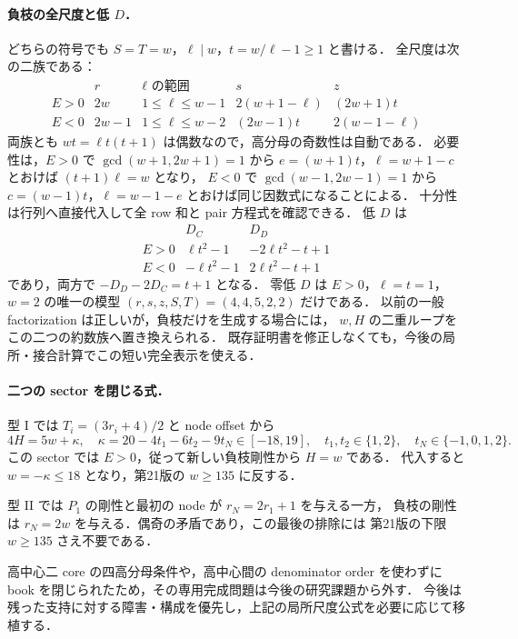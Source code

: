 \paragraph{負枝の全尺度と低 $D$．}
どちらの符号でも $S=T=w$，$\ell\mid w$，$t=w/\ell-1\ge1$ と書ける．
全尺度は次の二族である：
\[
 \begin{array}{c|c|c|c|c}
  &r&\ell\text{ の範囲}&s&z\\\hline
  E>0&2w&1\le\ell\le w-1&2(w+1-\ell)&(2w+1)t\\
  E<0&2w-1&1\le\ell\le w-2&(2w-1)t&2(w-1-\ell)
 \end{array}
\]
両族とも $wt=\ell t(t+1)$ は偶数なので，高分母の奇数性は自動である．
必要性は，$E>0$ で $\gcd(w+1,2w+1)=1$ から
$e=(w+1)t$，$\ell=w+1-c$ とおけば $(t+1)\ell=w$ となり，
$E<0$ で $\gcd(w-1,2w-1)=1$ から
$c=(w-1)t$，$\ell=w-1-e$ とおけば同じ因数式になることによる．
十分性は行列へ直接代入して全 row 和と pair 方程式を確認できる．
低 $D$ は
\[
 \begin{array}{c|cc}
  &D_C&D_D\\\hline
  E>0&\ell t^2-1&-2\ell t^2-t+1\\
  E<0&-\ell t^2-1&2\ell t^2-t+1
 \end{array}
\]
であり，両方で $-D_D-2D_C=t+1$ となる．
零低 $D$ は $E>0$，$\ell=t=1$，$w=2$ の唯一の模型
$(r,s,z,S,T)=(4,4,5,2,2)$ だけである．
以前の一般 factorization は正しいが，負枝だけを生成する場合には，
$w,H$ の二重ループをこの二つの約数族へ置き換えられる．
既存証明書を修正しなくても，今後の局所・接合計算でこの短い完全表示を使える．

\paragraph{二つの sector を閉じる式．}
型 I では $T_i=(3r_i+4)/2$ と node offset から
\[
 4H=5w+\kappa,\quad
 \kappa=20-4t_1-6t_2-9t_N\in[-18,19],
 \quad t_1,t_2\in\{1,2\},\quad t_N\in\{-1,0,1,2\}.
\]
この sector では $E>0$，従って新しい負枝剛性から $H=w$ である．
代入すると $w=-\kappa\le18$ となり，第21版の $w\ge135$ に反する．

型 II では $P_1$ の剛性と最初の node が $r_N=2r_1+1$ を与える一方，
負枝の剛性は $r_N=2w$ を与える．偶奇の矛盾であり，この最後の排除には
第21版の下限 $w\ge135$ さえ不要である．

高中心二 core の四高分母条件や，高中心間の denominator order を使わずに
book を閉じられたため，その専用完成問題は今後の研究課題から外す．
今後は残った支持に対する障害・構成を優先し，上記の局所尺度公式を必要に応じて移植する．
